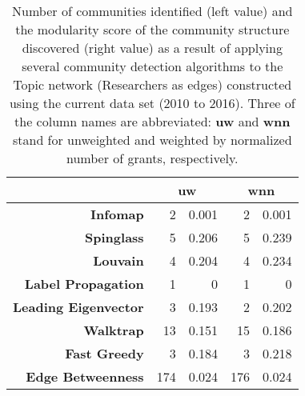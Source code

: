 \begin{table}[!htbp]
\centering
\caption[Number of communities and modularity score of community structure identified within the Topic network (Researchers as edges) constructed using the current data set (2010 to 2016)]{Number of communities identified (left value) and the modularity score of the community structure discovered (right value) as a result of applying several community detection algorithms to the Topic network (Researchers as edges) constructed using the current data set (2010 to 2016). Three of the column names are abbreviated: \textbf{uw} and \textbf{wnn} stand for unweighted and weighted by normalized number of grants, respectively.}
\label{table:topic_b_current_modularity_appendix}
\begin{tabular}{r|rr|rr}
\textbf{} & \multicolumn{2}{c|}{\textbf{uw}} & \multicolumn{2}{c}{\textbf{wnn}}\\
\hline
\textbf{Infomap} & {2} & {0.001} & {2} & {0.001}\\
\textbf{Spinglass} & {5} & {0.206} & {5} & {0.239}\\
\textbf{Louvain} & {4} & {0.204} & {4} & {0.234}\\
\textbf{Label Propagation} & {1} & {0} & {1} & {0}\\
\textbf{Leading Eigenvector} & {3} & {0.193} & {2} & {0.202}\\
\textbf{Walktrap} & {13} & {0.151} & {15} & {0.186}\\
\textbf{Fast Greedy} & {3} & {0.184} & {3} & {0.218}\\
\textbf{Edge Betweenness} & {174} & {0.024} & {176} & {0.024}\\
\end{tabular}
\end{table}


